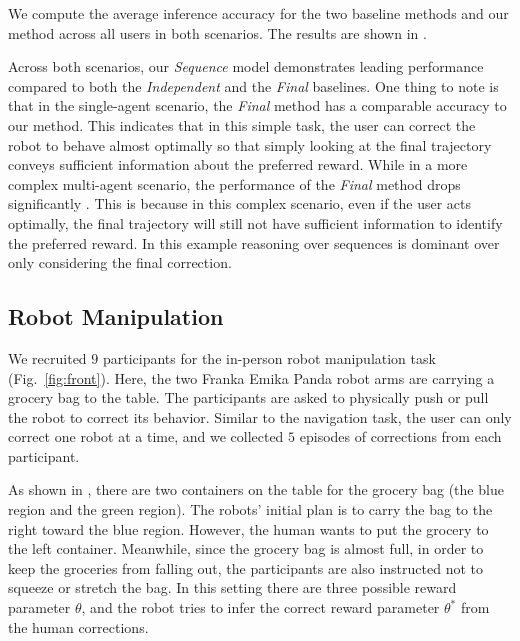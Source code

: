 We compute the average inference accuracy for the two baseline methods and our method across all users in both scenarios. The results are shown in . 




Across both scenarios, our \textit{Sequence} model demonstrates leading performance compared to both the \textit{Independent} and the \textit{Final} baselines. One thing to note is that in the single-agent scenario, the \textit{Final} method has a comparable accuracy to our method.
This indicates that in this simple task, the user can correct the robot to behave almost optimally so that simply looking at the final trajectory conveys sufficient information about the preferred reward. While in a more complex multi-agent scenario, the performance of the \textit{Final} method drops significantly
. 
This is because in this complex scenario, even if the user acts optimally, the final trajectory will still not have sufficient information to identify the preferred reward. In this example reasoning over sequences is dominant over only considering the final correction.



\subsection{Robot Manipulation}
\label{sec:exp_robot}
We recruited $9$ participants for the in-person robot manipulation task (Fig.~\ref{fig:front}). Here, the two Franka Emika Panda robot arms are carrying a grocery bag to the table. 
The participants are asked to physically push or pull the robot to correct its behavior. Similar to the navigation task, the user can only correct one robot at a time, and we collected $5$ episodes of corrections from each participant. 

As shown in , there are two containers on the table for the grocery bag (the blue region and the green region). The robots' initial plan is to carry the bag to the right toward the blue region. However, the human wants to put the grocery to the left container. Meanwhile, since the grocery bag is almost full, in order to keep the groceries from falling out, the participants are also instructed not to squeeze or stretch the bag. In this setting there are three possible reward parameter $\theta$, and the robot tries to infer the correct reward parameter $\theta^*$ from the human corrections. 

